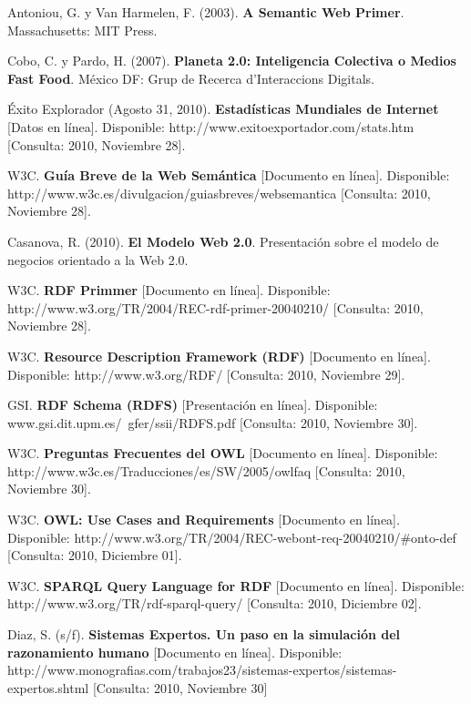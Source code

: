 \begin{thebibliography}{20}

     Antoniou, G. y Van Harmelen, F. (2003). \textbf{A Semantic Web Primer}. Massachusetts: MIT Press.

     Cobo, C. y Pardo, H. (2007). \textbf{Planeta 2.0: Inteligencia Colectiva o Medios Fast Food}. México DF: Grup de Recerca d'Interaccions Digitals.

     Éxito Explorador (Agosto 31, 2010). \textbf{Estadísticas Mundiales de Internet} [Datos en línea]. Disponible: http://www.exitoexportador.com/stats.htm [Consulta: 2010, Noviembre 28].

     W3C. \textbf{Guía Breve de la Web Semántica} [Documento en línea]. Disponible: http://www.w3c.es/divulgacion/guiasbreves/websemantica [Consulta: 2010, Noviembre 28].

     Casanova, R. (2010). \textbf{El Modelo Web 2.0}. Presentación sobre el modelo de negocios orientado a la Web 2.0.

     W3C. \textbf{RDF Primmer} [Documento en línea]. Disponible: http://www.w3.org/TR/2004/REC-rdf-primer-20040210/ [Consulta: 2010, Noviembre 28].

     W3C. \textbf{Resource Description Framework (RDF)} [Documento en línea]. Disponible: http://www.w3.org/RDF/ [Consulta: 2010, Noviembre 29].

     GSI. \textbf{RDF Schema (RDFS)} [Presentación en línea]. Disponible: www.gsi.dit.upm.es/~gfer/ssii/RDFS.pdf [Consulta: 2010, Noviembre 30].

     W3C. \textbf{Preguntas Frecuentes del OWL} [Documento en línea]. Disponible: http://www.w3c.es/Traducciones/es/SW/2005/owlfaq [Consulta: 2010, Noviembre 30].

     W3C. \textbf{OWL: Use Cases and Requirements} [Documento en línea]. Disponible: http://www.w3.org/TR/2004/REC-webont-req-20040210/\#onto-def [Consulta: 2010, Diciembre 01].

     W3C. \textbf{SPARQL Query Language for RDF} [Documento en línea]. Disponible: http://www.w3.org/TR/rdf-sparql-query/ [Consulta: 2010, Diciembre 02].

     Diaz, S. (s/f). \textbf{Sistemas Expertos. Un paso en la simulación del razonamiento humano} [Documento en línea]. Disponible: http://www.monografias.com/trabajos23/sistemas-expertos/sistemas-expertos.shtml [Consulta: 2010, Noviembre 30]


\end{thebibliography}
